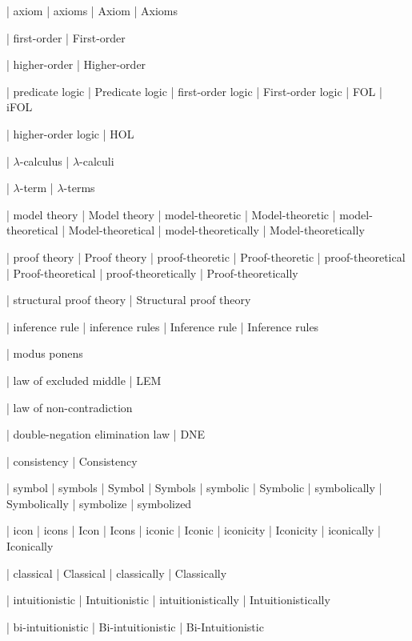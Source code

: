  | axiom
 | axioms
 | Axiom
 | Axioms

 | first-order
 | First-order

 | higher-order
 | Higher-order

 | predicate logic
 | Predicate logic
 | first-order logic
 | First-order logic
 | FOL
 | iFOL
 
 | higher-order logic
 | HOL

 | $\lambda$-calculus
 | $\lambda$-calculi
 
 | $\lambda$-term
 | $\lambda$-terms

 | model theory
 | Model theory
 | model-theoretic
 | Model-theoretic
 | model-theoretical
 | Model-theoretical
 | model-theoretically
 | Model-theoretically

 | proof theory
 | Proof theory
 | proof-theoretic
 | Proof-theoretic
 | proof-theoretical
 | Proof-theoretical
 | proof-theoretically
 | Proof-theoretically

 | structural proof theory
 | Structural proof theory

 | inference rule
 | inference rules
 | Inference rule
 | Inference rules

 | modus ponens

 | law of excluded middle
 | LEM

 | law of non-contradiction

 | double-negation elimination law
 | DNE

 | consistency
 | Consistency

 | symbol
 | symbols
 | Symbol
 | Symbols
 | symbolic
 | Symbolic
 | symbolically
 | Symbolically
 | symbolize
 | symbolized

 | icon
 | icons
 | Icon
 | Icons
 | iconic
 | Iconic
 | iconicity
 | Iconicity
 | iconically
 | Iconically
 
 | classical
 | Classical
 | classically
 | Classically

 | intuitionistic
 | Intuitionistic
 | intuitionistically
 | Intuitionistically

 | bi-intuitionistic
 | Bi-intuitionistic
 | Bi-Intuitionistic

